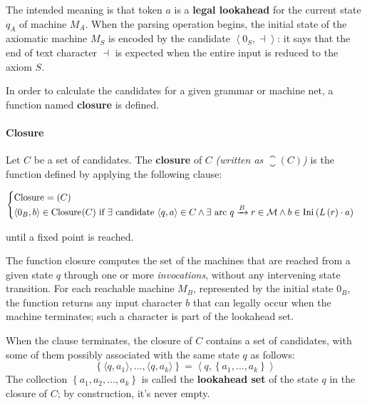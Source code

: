 \documentclass[english]{article}
\begin{document}
The intended meaning is that token \(a\) is a \textbf{legal lookahead} for the current state \(q_A\) of machine \(M_A\).
When the parsing operation begins, the initial state of the axiomatic machine \(M_S\) is encoded by the candidate \(\left\langle 0_S, \dashv \right\rangle\):
it says that the end of text character \(\dashv\) is expected when the entire input is reduced to the axiom \(S\).

In order to calculate the candidates for a given grammar or machine net, a function named \textbf{closure} is defined.

\paragraph{Closure}
\label{par:closure}

\begin{definition}[Closure]
  Let \(C\) be a set of candidates.
  The \textbf{closure} of \(C\) \textit{(written as \(\closure(C)\))} is the function defined by applying the following clause:

  \begin{gather*}
    \begin{cases}
      \closure = (C)                                                                                                                                                                                                                          \\
      \langle 0_B, b \rangle \in \closure(C) \ \text{if} \ \exists \ \text{candidate} \ \langle q,a \rangle \in C \land \exists \ \text{arc} \  q\xrightarrow{B} r \in \mathcal{M} \land b \in \Ini \left( L \left( r \right) \cdot a \right) \\
    \end{cases}
  \end{gather*}

  until a fixed point is reached.
\end{definition}

\bigskip
The function closure computes the set of the machines that are reached from a given state \(q\) through one or more \textit{invocations}, without any intervening state transition.
For each reachable machine \(M_B\), represented by the initial state \(0_B\), the function returns any input character \(b\) that can legally occur when the machine terminates;
such a character is part of the lookahead set.

When the clause terminates, the closure of \(C\) contains a set of candidates, with some of them possibly associated with the same state \(q\) as follows:
\[ \left\{ \langle q, a_1 \rangle, \ldots, \langle q, a_k \rangle \right\} = \left\langle q, \left\{ a_1, \ldots, a_k \right\} \right\rangle \]
The collection \(\left\{ a_1, a_2, \ldots, a_k \right\}\) is called the \textbf{lookahead set} of the state \(q\) in the closure of \(C\);
by construction, it's never empty.
\end{document}
